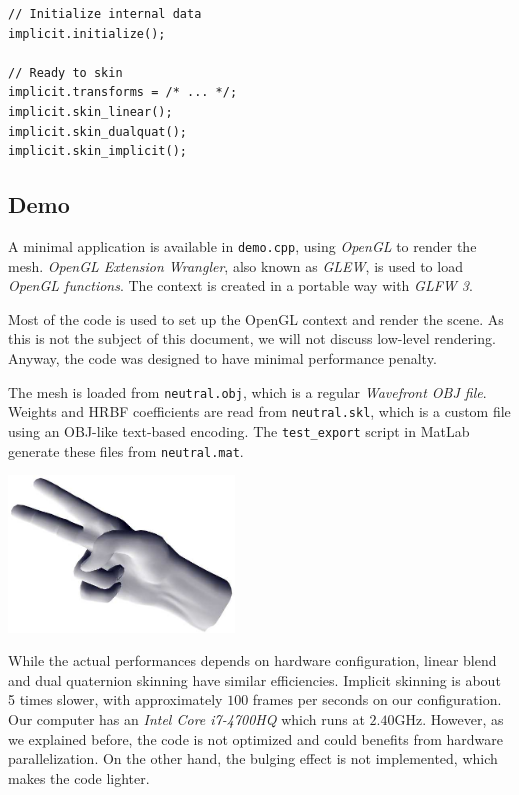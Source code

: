 \documentclass[a4paper,10pt]{article}
\begin{document}
\begin{multicols}{2}
\begin{lstlisting}
// Initialize internal data
implicit.initialize();

// Ready to skin
implicit.transforms = /* ... */;
implicit.skin_linear();
implicit.skin_dualquat();
implicit.skin_implicit();
\end{lstlisting}


\subsection{Demo}

A minimal application is available in \lstinline!demo.cpp!, using \emph{OpenGL} to render the mesh.
\emph{OpenGL Extension Wrangler}\cite{glew}, also known as \emph{GLEW}, is used to load \emph{OpenGL functions}.
The context is created in a portable way with \emph{GLFW 3}\cite{glfw}.

Most of the code is used to set up the OpenGL context and render the scene.
As this is not the subject of this document, we will not discuss low-level rendering.
Anyway, the code was designed to have minimal performance penalty.

The mesh is loaded from \lstinline!neutral.obj!, which is a regular \emph{Wavefront OBJ file}.
Weights and HRBF coefficients are read from \lstinline!neutral.skl!, which is a custom file using an OBJ-like text-based encoding.
The \lstinline!test_export! script in MatLab generate these files from \lstinline!neutral.mat!.

\begin{center}
\includegraphics[width=0.45\textwidth]{figs/demo_cpp}
\end{center}

While the actual performances depends on hardware configuration, linear blend and dual quaternion skinning have similar efficiencies.
Implicit skinning is about 5 times slower, with approximately $100$ frames per seconds on our configuration.
Our computer has an \emph{Intel Core i7-4700HQ} which runs at $2.40$GHz.
However, as we explained before, the code is not optimized and could benefits from hardware parallelization.
On the other hand, the bulging effect is not implemented, which makes the code lighter.


\printbibliography


\end{multicols}
\end{document}
